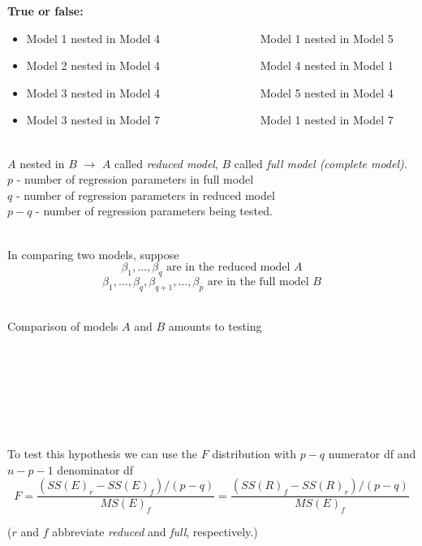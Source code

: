\textbf{True or false:}
\begin{itemize}
\item Model 1 nested in Model 4 ~~~~~~~~~~~~~~~~~Model 1 nested in Model 5
\item Model 2 nested in Model 4 ~~~~~~~~~~~~~~~~~Model 4 nested in Model 1
\item Model 3 nested in Model 4 ~~~~~~~~~~~~~~~~~Model 5 nested in Model 4
\item Model 3 nested in Model 7 ~~~~~~~~~~~~~~~~~Model 1 nested in Model 7
\end{itemize}
~\\
$A$ nested in $B$ $\longrightarrow$ $A$ called {\em reduced model}, $B$ called {\em full model (complete model)}.  \\
$p$ - number of regression parameters in full model  \\
$q$ - number of regression parameters in reduced model \\
$p-q$ - number of regression parameters being tested. \\~\\

\newpage

In comparing two models, suppose
$$\beta_1,\ldots,\beta_q\mbox{ are in the reduced model } A$$
$$\beta_1,\ldots,\beta_q,\beta_{q+1},\ldots,\beta_p \mbox{ are in the full model } B$$

~\\Comparison of models $A$ and $B$ amounts to testing\\~\\~\\~\\~\\~\\~\\~\\

To test this hypothesis we can use the $F$ distribution with $p-q$ numerator df and $n-p-1$ denominator df
$$F = \frac{(SS(E)_r - SS(E)_f)/(p-q)}{MS(E)_f}=\frac{(SS(R)_f - SS(R)_r)/(p-q)}{MS(E)_f}$$

($r$ and $f$ abbreviate {\em reduced} and {\em full}, respectively.)\\~\\

